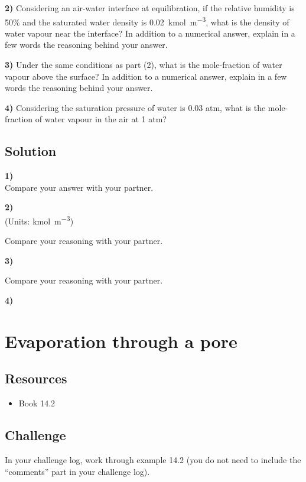 \textbf{2)} Considering an air-water interface at equilibration, if the relative humidity is 50\% and the saturated water density is \SI{0.02}{\kmol\per\cubic\meter}, what is the density of water vapour near the interface? In addition to a numerical answer, explain in a few words the reasoning behind your answer.

\textbf{3)} Under the same conditions as part (2), what is the mole-fraction of water vapour above the surface? In addition to a numerical answer, explain in a few words the reasoning behind your answer.

\textbf{4)} Considering the saturation pressure of water is 0.03 atm, what is the mole-fraction of water vapour in the air at 1 atm?

\subsection*{Solution}
\textbf{1)}\\
Compare your answer with your partner.

\textbf{2)}\\
(Units: \si{\kmol\per\cubic\meter})\\

Compare your reasoning with your partner.

\textbf{3)}\\

Compare your reasoning with your partner.

\textbf{4)}\\




\newpage
\section{Evaporation through a pore}

\subsection*{Resources}
\begin{itemize}
    \item Book 14.2
\end{itemize}

\subsection*{Challenge}
In your challenge log, work through example 14.2 (you do not need to include the ``comments'' part in your challenge log).




